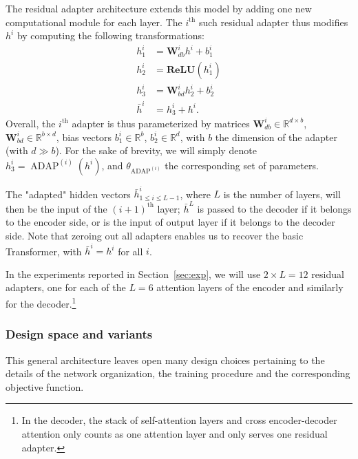 \documentclass[11pt,a4paper]{article}
\newcommand{\fyTodo}[1]{\Todo[FY:]{\textcolor{orange}{#1}}}
\newcommand{\fyDone}[1]{\done[FY]\Todo[FY:]{\textcolor{orange}{#1}}}
\begin{document}
The residual adapter architecture extends this model by adding one new computational module for each layer. The $i^{\text{th}}$ such residual adapter thus modifies $h^i$ by computing the following transformations:\fyDone{Use align env}
\begin{align*}
  h^{i}_1 &= \mathbf{W}_{db}^{i}h^{i} + b^i_{1} \\
  h^{i}_2 &= \mathbf{ReLU}(h_1^{i}) \\
  h^{i}_3 &= \mathbf{W}_{bd}^{i}h_2^{i} + b^i_{2} \\
  \bar{h}^{i} &= h^{i}_3 + h^i.
\end{align*}
Overall, the  $i^{\text{th}}$ adapter is thus parameterized by matrices $\displaystyle{\mathbf{W}_{db}^{i}\in\mathbb{R}^{d\times b}}$,$\displaystyle{\mathbf{W}_{bd}^{i}\in\mathbb{R}^{b\times d}}$, bias vectors $\displaystyle{b^i_{1} \in \mathbb{R}^{b}}$, $\displaystyle{b^i_{2} \in \mathbb{R}^{d}}$, with $b$ the dimension of the adapter (with $d \gg b$)\fyTodo{Check this}. For the sake of brevity, we will simply denote $h^{i}_3 = \operatorname{ADAP}^{(i)}(h^i)$, and $\theta_{\operatorname{ADAP}^{(i)}}$ the corresponding set of parameters.\fyDone{or is it $h_i$ ?}\fyDone{attention aux matrices $W_i$}

The "adapted" hidden vectors $\bar{h}^i_{ 1\leq i \leq L-1}$, where $L$ is the number of layers, will then be the input of the $(i+1)^{\text{th}}$\fyDone{Self attention ?} layer; $\bar{h}^L$ is passed to the decoder if it belongs to the encoder side, or is the input of output layer if it belongs to the decoder side. Note that zeroing out all adapters enables us to recover the basic Transformer, with $\bar{h}^{i} = h^i$ for all $i$.

In the experiments reported in Section~\ref{sec:exp}, we will use $2\times{}L=12$ residual adapters, one for each of the $L=6$ attention layers of the encoder and similarly for the decoder.\footnote{In the decoder, the stack of self-attention layers and cross encoder-decoder attention only counts as one attention layer and only serves one residual adapter.}

\subsubsection{Design space and variants}
This general architecture leaves open many design choices pertaining to the details of the network organization, the training procedure and the corresponding objective function.
\end{document}
